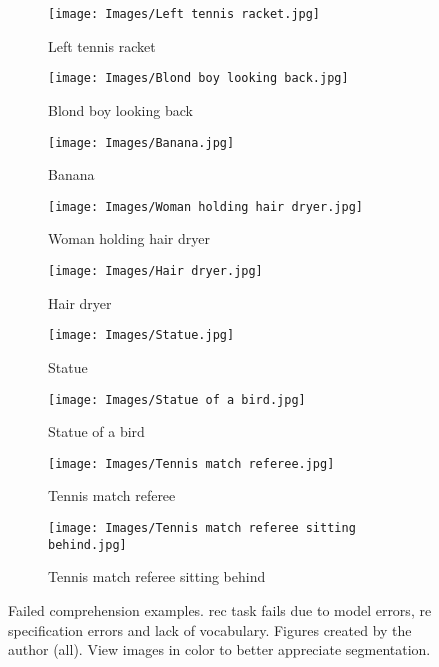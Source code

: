 \begin{figure}[p]
  \centering
  \begin{subfigure}[t]{.32\textwidth}
    \centering
    \caption{Left tennis racket}\label{fig:racket}
    \texttt{[image: Images/Left tennis racket.jpg]}
  \end{subfigure}\hfill
  \begin{subfigure}[t]{.32\textwidth}
    \centering
    \caption{Blond boy looking back}\label{fig:blond}
    \texttt{[image: Images/Blond boy looking back.jpg]}
  \end{subfigure}\hfill
  \begin{subfigure}[t]{.32\textwidth}
    \centering
    \caption{Banana}\label{fig:banana}
    \texttt{[image: Images/Banana.jpg]}
  \end{subfigure}

  \bigskip
  \begin{subfigure}[t]{.32\textwidth}
    \centering
    \caption{Woman holding hair dryer}\label{fig:dryer-1}
    \texttt{[image: Images/Woman holding hair dryer.jpg]}
  \end{subfigure}\hspace{.1\textwidth}
  \begin{subfigure}[t]{.32\textwidth}
    \centering
    \caption{Hair dryer}\label{fig:dryer-2}
    \texttt{[image: Images/Hair dryer.jpg]}
  \end{subfigure}

  \bigskip
  \begin{subfigure}[t]{.4\textwidth}
    \centering
    \caption{Statue}\label{fig:statue-1}
    \texttt{[image: Images/Statue.jpg]}
  \end{subfigure}\hspace{.06\textwidth}
  \begin{subfigure}[t]{.4\textwidth}
    \centering
    \caption{Statue of a bird}\label{fig:statue-2}
    \texttt{[image: Images/Statue of a bird.jpg]}
  \end{subfigure}

  \bigskip
  \begin{subfigure}[t]{.45\textwidth}
    \centering
    \caption{Tennis match referee}\label{fig:referee-1}
    \texttt{[image: Images/Tennis match referee.jpg]}
  \end{subfigure}\hspace{.05\textwidth}
  \begin{subfigure}[t]{.45\textwidth}
    \centering
    \caption{Tennis match referee sitting behind}\label{fig:referee-2}
    \texttt{[image: Images/Tennis match referee sitting behind.jpg]}
  \end{subfigure}
  \caption[Failed comprehension examples]{Failed comprehension
    examples. \gls{rec} task fails due to model errors, \gls{re} specification
    errors and lack of vocabulary. Figures created by the author (all). View
    images in color to better appreciate segmentation.}\label{fig:failure}
\end{figure}

